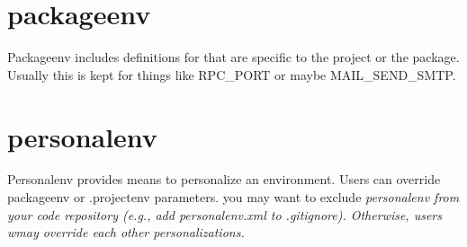 \documentclass[design.tex]{subfiles}
\begin{document}
\section{packageenv}
Packageenv includes definitions for that are specific to the project or the package.  Usually this is kept for things like RPC\_PORT or maybe MAIL\_SEND\_SMTP. 

\section{personalenv}
Personalenv provides means to personalize an environment.  Users can override packageenv or .projectenv parameters.
you may want to exclude \em{personalenv} from your code repository (e.g., add personalenv.xml to .gitignore).  Otherwise, users wmay override each other personalizations. 
\end{document}
